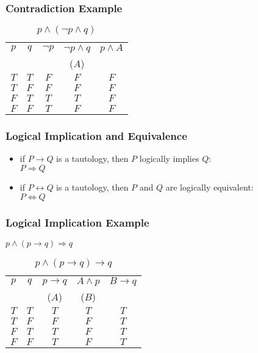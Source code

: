 \documentclass[dvipsnames]{beamer}
\begin{document}
\begin{frame}
  \frametitle{Contradiction Example}

  \begin{table}
    \caption{$p \wedge (\neg p \wedge q)$}
    \begin{tabular}{|c|c|c|c||c|}\hline
      $p$ & $q$ & $\neg p$ & $\neg p \wedge q$ & $p \wedge A$\\
          &     &          & ($A$)             &\\\hline\hline
      $T$ & $T$ & $F$ & $F$ & $F$\\\hline
      $T$ & $F$ & $F$ & $F$ & $F$\\\hline
      $F$ & $T$ & $T$ & $T$ & $F$\\\hline
      $F$ & $F$ & $T$ & $F$ & $F$\\\hline
    \end{tabular}
  \end{table}
\end{frame}

\begin{frame}
  \frametitle{Logical Implication and Equivalence}

  \begin{itemize}
    \item if $P \rightarrow Q$ is a tautology,
      then $P$ \alert{logically implies} $Q$:\\
      $P \Rightarrow Q$

    \pause
    \medskip
    \item if $P \leftrightarrow Q$ is a tautology,
      then $P$ and $Q$ are \alert{logically equivalent}:\\
      $P \Leftrightarrow Q$
  \end{itemize}
\end{frame}

\begin{frame}
  \frametitle{Logical Implication Example}

  $p \wedge (p \rightarrow q) \Rightarrow q$

  \begin{table}
    \caption{$p \wedge (p \rightarrow q) \rightarrow q$}
    \begin{tabular}{|c|c|c|c||c|}\hline
      $p$ & $q$ & $p \rightarrow q$ & $A \wedge p$ & $B \rightarrow q$\\
          &     & ($A$)             & ($B$)        &\\\hline\hline
      $T$ & $T$ & $T$ & $T$ & $T$\\\hline
      $T$ & $F$ & $F$ & $F$ & $T$\\\hline
      $F$ & $T$ & $T$ & $F$ & $T$\\\hline
      $F$ & $F$ & $T$ & $F$ & $T$\\\hline
    \end{tabular}
  \end{table}
\end{frame}
\end{document}
